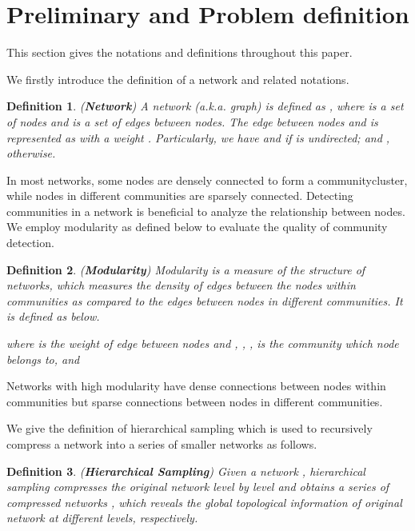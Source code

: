 \documentclass[conference]{IEEEtran}
\begin{document}
\section{Preliminary and Problem definition}
This section gives the notations and definitions throughout this paper.

We firstly introduce the definition of a network and related notations.
\newtheorem{mydef}{Definition}
\begin{mydef}
	(\textbf{Network}) \cite{goyal2018graph} A network (a.k.a. graph) is defined as , where  is a set of nodes and  is a set of edges between nodes. The edge  between nodes  and  is represented as   with a weight . Particularly, we have  and  if  is undirected;  and , otherwise.
\end{mydef}

In most networks, some nodes are densely connected to form a communitycluster, while nodes in different communities are sparsely connected. Detecting communities in a network is beneficial to analyze the relationship between nodes. We employ modularity as defined below to evaluate the quality of community detection.

\begin{mydef}
    (\textbf{Modularity}) \cite{newman2006modularity, newman2004analysis} Modularity is a measure of the structure of networks, which measures the density of edges between the nodes within communities as compared to the edges between nodes in different communities. It is defined as below.
    
    \noindent where  is the weight of edge  between nodes  and , , ,  is the community which node  belongs to, and \\
    
\end{mydef}

Networks with high modularity have dense connections between nodes within communities but sparse connections between nodes in different communities.

We give the definition of hierarchical sampling which is used to recursively compress a network into a series of smaller networks as follows.

\begin{mydef}
    (\textbf{Hierarchical Sampling}) Given a network , hierarchical sampling compresses the original network level by level and obtains a series of compressed networks , which reveals the global topological information of original network at different levels, respectively. 
\end{mydef}
\end{document}
